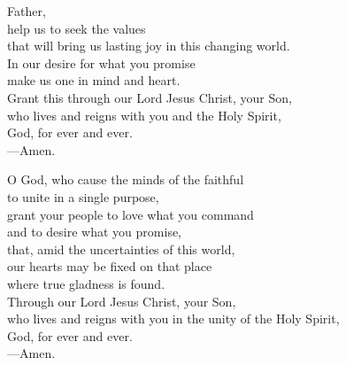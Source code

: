 \prayer


\begin{prayerverse}
Father,\\
help us to seek the values\\
that will bring us lasting joy in this changing world.\\
In our desire for what you promise\\
make us one in mind and heart.\\
Grant this through our Lord Jesus Christ, your Son,\\
who lives and reigns with you and the Holy Spirit,\\
God, for ever and ever.\\
{\color{red}---\thinspace}Amen.
\end{prayerverse}


\begin{prayerverse}
O God, who cause the minds of the faithful\\
to unite in a single purpose,\\
grant your people to love what you command\\
and to desire what you promise,\\
that, amid the uncertainties of this world,\\
our hearts may be fixed on that place\\
where true gladness is found.\\
Through our Lord Jesus Christ, your Son,\\
who lives and reigns with you in the unity of the Holy Spirit,\\
God, for ever and ever.\\
{\color{red}---\thinspace}Amen.
\end{prayerverse}


